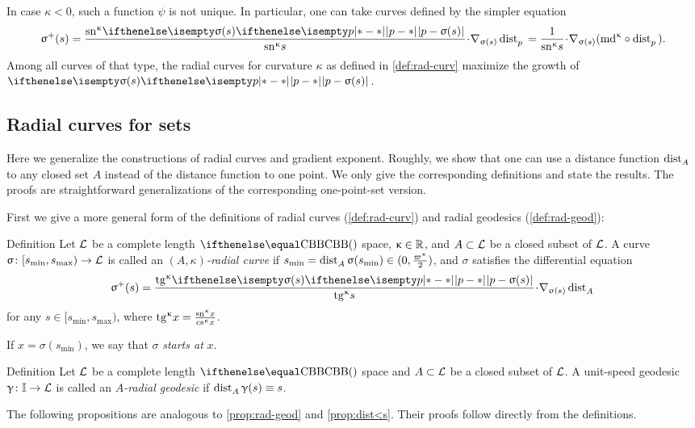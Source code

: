 In case $\kappa<0$, such a function $\psi$ is not unique.
In particular, one can take curves defined by the simpler equation
\[\sigma^+(s)
=
\frac{\sn\kappa \dist[{{}}]{p}{\sigma(s)}{}}{\sn\kappa s}\cdot\nabla_{\sigma(s)}\distfun{p}{}{}
=
\frac{1}{\sn\kappa s}\cdot\nabla_{\sigma(s)}(\md\kappa\circ\distfun{p}{}{}).\]
Among all curves of that type, the radial curves for curvature $\kappa$ 
as defined in \ref{def:rad-curv} maximize the growth of $\dist{p}{\sigma(s)}{}$.

\subsection*{Radial curves for sets}

Here we generalize the constructions of radial curves and gradient exponent.
Roughly, we show that one can use a distance function 
$\mathop{\rm dist}\nolimits_{A}^{{}}{}{}$ to any closed set $A$ instead of the distance function to one point.
We only give the corresponding definitions and state the results.
The proofs are straightforward generalizations of the corresponding one-point-set version. 

First we give a more general form of the definitions of radial curves (\ref{def:rad-curv}) and radial geodesics (\ref{def:rad-geod}):

\begin{thm}{Definition}
Let $\mathcal{L}$ be a complete length $\Alex{}$ space, 
$\kappa\in\RR$, 
and $A\subset \spc{L}$ be a closed subset of $\mathcal{L}$.
A curve $\sigma\:[s_{\min},s_{\max})\to \spc{L}$  is called an
\emph{$(A,\kappa)$-radial curve} 
if
$s_{\min}
\z=
\distfun{A}{\sigma(s_{\min})}{}\in(0,\tfrac{\varpi\kappa}2)$, 
and $\sigma$ satisfies the differential equation
\[\sigma^+(s)
\z=
\frac{\tg\kappa\dist[{{}}]{p}{\sigma(s)}{}}{\tg\kappa s}
\cdot
\nabla_{\sigma(s)}\distfun{A}{}{}\]
for any $s\in[s_{\min},s_{\max})$, where $\mathrm{tg}^{\upkappa} x=\frac{\mathrm{sn}^{\upkappa} x}{\mathrm{cs}^{\upkappa} x}$.

If $x=\sigma(s_{\min})$, we say that $\sigma$ {}\emph{starts at}  $x$.
\end{thm}

\begin{thm}{Definition}
Let $\mathcal{L}$ be a complete length $\Alex{}$ space
and $A\subset \spc{L}$ be a closed subset of $\mathcal{L}$.
A unit-speed geodesic  $\gamma\:\II\to \spc{L}$  is called an
\emph{$A$-radial geodesic} if 
$\mathop{\rm dist}\nolimits_{A}^{{}}{\upgamma(s)}{}\equiv s$.
\end{thm}

The following propositions are analogous to  \ref{prop:rad-geod} and \ref{prop:dist<s}.
Their proofs follow directly from the definitions.

